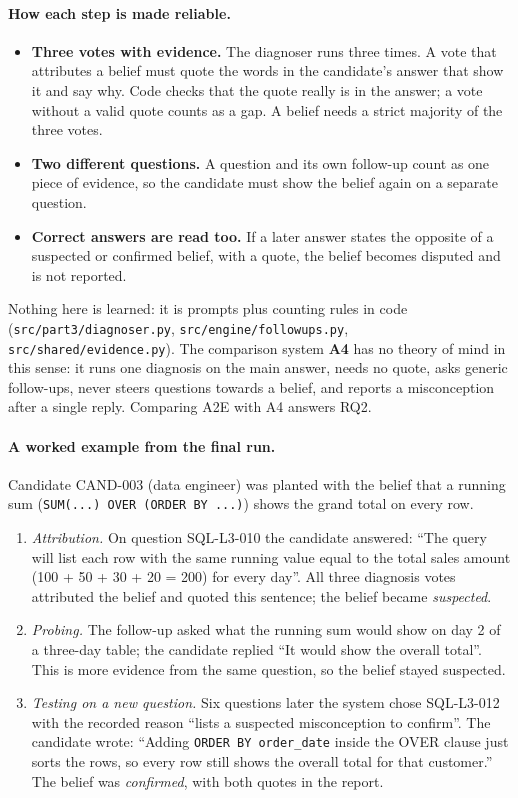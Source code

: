 \documentclass[10pt,a4paper]{article}
\begin{document}
\paragraph{How each step is made reliable.}
\begin{itemize}
  \item \textbf{Three votes with evidence.} The diagnoser runs three times. A vote that attributes a
  belief must quote the words in the candidate's answer that show it and say why. Code checks that the
  quote really is in the answer; a vote without a valid quote counts as a gap. A belief needs a strict
  majority of the three votes.
  \item \textbf{Two different questions.} A question and its own follow-up count as one piece of
  evidence, so the candidate must show the belief again on a separate question.
  \item \textbf{Correct answers are read too.} If a later answer states the opposite of a suspected or
  confirmed belief, with a quote, the belief becomes disputed and is not reported.
\end{itemize}
Nothing here is learned: it is prompts plus counting rules in code (\texttt{src/part3/diagnoser.py},
\texttt{src/engine/followups.py}, \texttt{src/shared/evidence.py}). The comparison system \textbf{A4}
has no theory of mind in this sense: it runs one diagnosis on the main answer, needs no quote, asks
generic follow-ups, never steers questions towards a belief, and reports a misconception after a
single reply. Comparing A2E with A4 answers RQ2.

\paragraph{A worked example from the final run.} Candidate CAND-003 (data engineer) was planted with
the belief that a running sum (\texttt{SUM(...) OVER (ORDER BY ...)}) shows the grand total on every row.
\begin{enumerate}[leftmargin=*]
  \item \emph{Attribution.} On question SQL-L3-010 the candidate answered: ``The query will list each
  row with the same running value equal to the total sales amount (100 + 50 + 30 + 20 = 200) for every
  day''. All three diagnosis votes attributed the belief and quoted this sentence; the belief became
  \emph{suspected}.
  \item \emph{Probing.} The follow-up asked what the running sum would show on day 2 of a three-day
  table; the candidate replied ``It would show the overall total''. This is more evidence from the
  same question, so the belief stayed suspected.
  \item \emph{Testing on a new question.} Six questions later the system chose SQL-L3-012 with the
  recorded reason ``lists a suspected misconception to confirm''. The candidate wrote: ``Adding
  \texttt{ORDER BY order\_date} inside the OVER clause just sorts the rows, so every row still shows the
  overall total for that customer.'' The belief was \emph{confirmed}, with both quotes in the report.
\end{enumerate}
\end{document}

